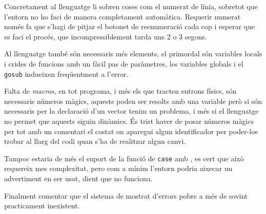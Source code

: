 Concretament al llenguatge li sobren coses com el numerat de línia,
sobretot que l'entorn no ho faci de manera completament automàtica.
Requerir numerat només fa que s'hagi de pitjar el botonet de reenumeració
cada cop i esperar que es faci el procés, que incompressiblement tarda
uns 2 o 3 segons.

Al llenguatge també són necessaris més elements, el primordal són
variables locals i crides de funcions amb un fàcil pas de paràmetres,
les variables globals i el \texttt{gosub} indueixen freqüentment a l'error.

Falta de \emph{macros}, en tot programa, i més els que tracten entrons físics,
són necessaris números màgics, aquests poden ser resolts amb una variable
però si són necessaris per la declaració d'un vector tenim un problema,
i més si el llenguatge no permet que aquests siguin dinàmics. És
trist haver de posar números màgics per tot amb un comentari el costat
on aparegui algun identificador per poder-los trobar al llarg del codi
quan s'ha de realitzar algun canvi.

Tampoc estaria de més el suport de la funció de \texttt{case} amb ,
es cert que això requereix mes complexitat, pero com a mínim l'entorn podria
aixecar un advertiment en ser usat, dient que no funciona.

Finalment comentar que el sistema de mostrat d'errors pobre a més de sovint
practicament inexistent.
